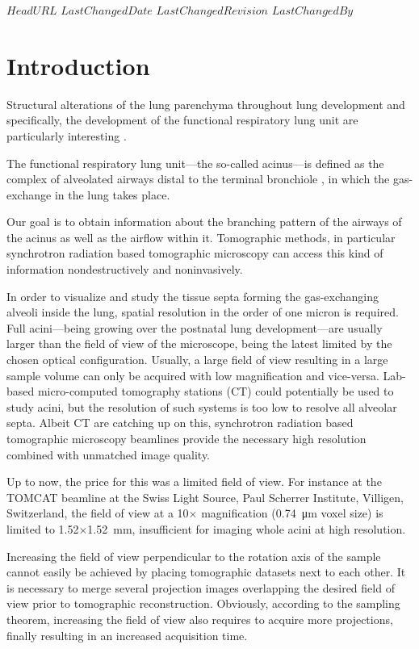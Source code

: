 \svnidlong
{$HeadURL$}
{$LastChangedDate$}
{$LastChangedRevision$}
{$LastChangedBy$}
%
\section{Introduction}
Structural alterations of the lung parenchyma throughout lung development and specifically, the development of the functional respiratory lung unit are particularly interesting \cite{Schittny2008,Mund2008,Tsuda2008}.

The functional respiratory lung unit---the so-called acinus---is defined as the complex of alveolated airways distal to the terminal bronchiole \cite{Rodriguez1987}, in which the gas-exchange in the lung takes place. 

Our goal is to obtain information about the branching pattern of the airways of the acinus as well as the airflow within it. Tomographic methods, in particular synchrotron radiation based tomographic microscopy can access this kind of information nondestructively and noninvasively. 

In order to visualize and study the tissue septa forming the gas-exchanging alveoli inside the lung, spatial resolution in the order of one micron is required. Full acini---being growing over the postnatal lung development---are usually larger than the field of view of the microscope, being the latest limited by the chosen optical configuration. Usually, a large field of view resulting in a large sample volume can only be acquired with low magnification and vice-versa. Lab-based micro-computed tomography stations (\micro CT) could potentially be used to study acini, but the resolution of such systems is too low to resolve all alveolar septa. Albeit \micro CT are catching up on this, synchrotron radiation based tomographic microscopy beamlines provide the necessary high resolution combined with unmatched image quality.

Up to now, the price for this was a limited field of view. For instance at the TOMCAT beamline \cite{Stampanoni2007} at the Swiss Light Source, Paul Scherrer Institute, Villigen, Switzerland, the field of view at a 10$\times$ magnification (\SI{0.74}{\micro\meter} voxel size) is limited to 1.52$\times$\SI{1.52}{\milli\meter}, insufficient for imaging whole acini at high resolution.

Increasing the field of view perpendicular to the rotation axis of the sample cannot easily be achieved by placing tomographic datasets next to each other. It is necessary to merge several projection images overlapping the desired field of view prior to tomographic reconstruction. Obviously, according to the sampling theorem, increasing the field of view also requires to acquire more projections, finally resulting in an increased acquisition time.

